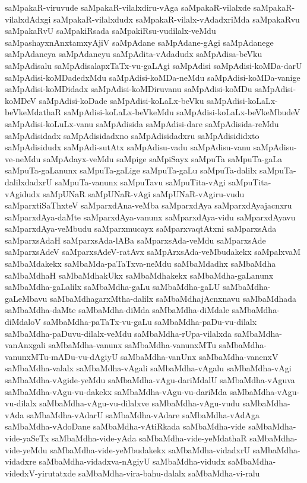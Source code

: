 {saMpakaR-viruvude
saMpakaR-vilalxdiru-vAga
saMpakaR-vilalxde
saMpakaR-vilalxdAdxgi
saMpakaR-vilalxdudx
saMpakaR-vilalx-vAdadxriMda
saMpakaRvu
saMpakaRvU
saMpakiRsada
saMpakiRsu-vudilalx-veMdu
saMpashayxnAnxtamxyAjiV
saMpAdane
saMpAdane-gAgi
saMpAdanege
saMpAdaneya
saMpAdaneyu
saMpAdita-vAdadudx
saMpAdisa-beVku
saMpAdisalu
saMpAdisalapxTaTx-vu-gaLAgi
saMpAdisi
saMpAdisi-koMDa-darU
saMpAdisi-koMDadedxMdu
saMpAdisi-koMDa-neMdu
saMpAdisi-koMDa-vanige
saMpAdisi-koMDidadx
saMpAdisi-koMDiruvanu
saMpAdisi-koMDu
saMpAdisi-koMDeV
saMpAdisi-koDade
saMpAdisi-koLaLx-beVku
saMpAdisi-koLaLx-beVkeMdathaR
saMpAdisi-koLaLx-beVkeMdu
saMpAdisi-koLaLx-beVkeMbudeV
saMpAdisi-koLuLx-vanu
saMpAdisida
saMpAdisi-dare
saMpAdisida-reMdu
saMpAdisidadx
saMpAdisidadxno
saMpAdisidadxru
saMpAdisididxto
saMpAdisidudx
saMpAdi-sutAtx
saMpAdisu-vadu
saMpAdisu-vanu
saMpAdisu-ve-neMdu
saMpAdayx-veMdu
saMpige
saMpiSayx
saMpuTa
saMpuTa-gaLa
saMpuTa-gaLanunx
saMpuTa-gaLige
saMpuTa-gaLu
saMpuTa-dalilx
saMpuTa-dalilxdadxrU
saMpuTa-vanunx
saMpuTavu
saMpuTita-vAgi
saMpuTita-vAgidudx
saMpUNaR
saMpUNaR-vAgi
saMpUNaR-vAgiru-vudu
saMparxtiSaThxteV
saMparxdAna-veMba
saMparxdAya
saMparxdAyajacnxru
saMparxdAya-daMte
saMparxdAya-vanunx
saMparxdAya-vidu
saMparxdAyavu
saMparxdAya-veMbudu
saMparxmucayx
saMparxvaqtAtxni
saMparxsAda
saMparxsAdaH
saMparxsAda-lABa
saMparxsAda-veMdu
saMparxsAde
saMparxsAdeV
saMparxsAdeV-ratAvx
saMpArxsAda-veMbudakekx
saMpalxvaM
saMbaMdakekx
saMbaMda-paTaTxva-neMdu
saMbaMdadhx
saMbaMdha
saMbaMdhaH
saMbaMdhakUkx
saMbaMdhakekx
saMbaMdha-gaLanunx
saMbaMdha-gaLalilx
saMbaMdha-gaLu
saMbaMdha-gaLU
saMbaMdha-gaLeMbavu
saMbaMdhagarxMtha-dalilx
saMbaMdhajAcnxnavu
saMbaMdhada
saMbaMdha-daMte
saMbaMdha-diMda
saMbaMdha-diMdale
saMbaMdha-diMdaloV
saMbaMdha-paTaTx-vu-gaLu
saMbaMdha-paDu-vu-dilalx
saMbaMdha-paDuvu-dilalx-veMdu
saMbaMdha-rUpa-vilalxda
saMbaMdha-vanAnxgali
saMbaMdha-vanunx
saMbaMdha-vanunxMTu
saMbaMdha-vanunxMTu-mADu-vu-dAgiyU
saMbaMdha-vanUnx
saMbaMdha-vanenxV
saMbaMdha-valalx
saMbaMdha-vAgali
saMbaMdha-vAgalu
saMbaMdha-vAgi
saMbaMdha-vAgide-yeMdu
saMbaMdha-vAgu-dariMdalU
saMbaMdha-vAguva
saMbaMdha-vAgu-vu-dakekx
saMbaMdha-vAgu-vu-dariMda
saMbaMdha-vAgu-vu-dilalx
saMbaMdha-vAgu-vu-dilalxve
saMbaMdha-vAgu-vudu
saMbaMdha-vAda
saMbaMdha-vAdarU
saMbaMdha-vAdare
saMbaMdha-vAdAga
saMbaMdha-vAdoDane
saMbaMdha-vAtiRkada
saMbaMdha-vide
saMbaMdha-vide-yaSeTx
saMbaMdha-vide-yAda
saMbaMdha-vide-yeMdathaR
saMbaMdha-vide-yeMdu
saMbaMdha-vide-yeMbudakekx
saMbaMdha-vidadxrU
saMbaMdha-vidadxre
saMbaMdha-vidadxva-nAgiyU
saMbaMdha-vidudx
saMbaMdha-videdxV-yirutatxde
saMbaMdha-vira-bahu-dalalx
saMbaMdha-vi-ralu
}

